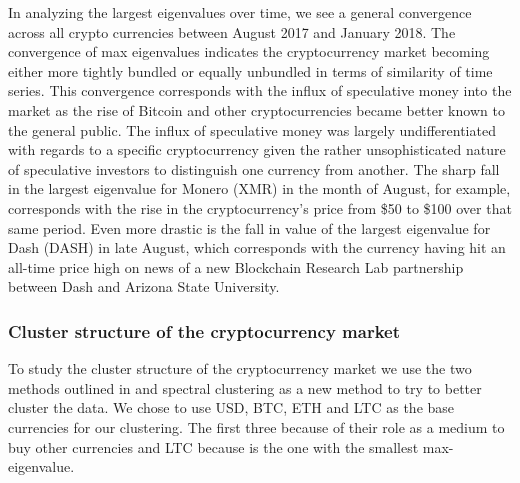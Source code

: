 \documentclass[a4paper]{article}
\begin{document}
\begin{multicols}{2}

In analyzing the largest eigenvalues over time, we see a general convergence across all crypto currencies between August 2017 and January 2018. The convergence of max eigenvalues indicates the cryptocurrency market becoming either more tightly bundled or equally unbundled in terms of similarity of time series. This convergence corresponds with the influx of speculative money into the market as the rise of Bitcoin and other cryptocurrencies became better known to the general public. The influx of speculative money was largely undifferentiated with regards to a specific cryptocurrency given the rather unsophisticated nature of speculative investors to distinguish one currency from another. The sharp fall in the largest eigenvalue for Monero (XMR) in the month of August, for example, corresponds with the rise in the cryptocurrency’s price from \$50 to \$100 over that same period. Even more drastic is the fall in value of the largest eigenvalue for Dash (DASH) in late August, which corresponds with the currency having hit an all-time price high on news of a new Blockchain Research Lab partnership between Dash and Arizona State University. 

\subsubsection{Cluster structure of the cryptocurrency market}
To study the cluster structure of the cryptocurrency market we use the two methods outlined in \cite{kawpien} and spectral clustering as a new method to try to better cluster the data. We chose to use USD, BTC, ETH and LTC as the base currencies for our clustering. The first three because of their role as a medium to buy other currencies and LTC because is the one with the smallest max-eigenvalue.


\end{multicols}
\end{document}
